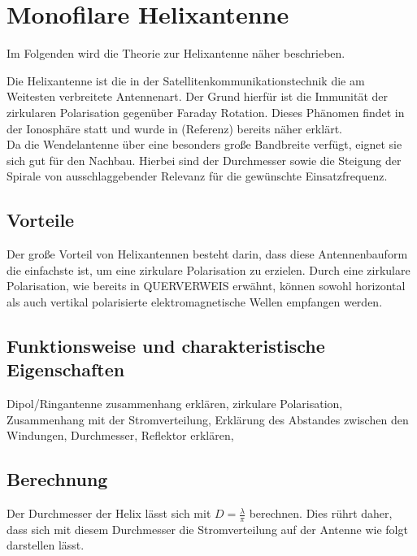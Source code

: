 \section{Monofilare Helixantenne}
Im Folgenden wird die Theorie zur Helixantenne näher beschrieben.

Die Helixantenne ist die in der Satellitenkommunikationstechnik die am Weitesten verbreitete Antennenart. Der Grund hierfür ist die Immunität der zirkularen Polarisation gegenüber Faraday Rotation. Dieses Phänomen findet in der Ionosphäre statt und wurde in (Referenz) bereits näher erklärt. \\
\newline
Da die Wendelantenne über eine besonders große Bandbreite verfügt, eignet sie sich gut für den Nachbau. Hierbei sind der Durchmesser sowie die Steigung der Spirale von ausschlaggebender Relevanz für die gewünschte Einsatzfrequenz. 

\subsection{Vorteile}
Der große Vorteil von Helixantennen besteht darin, dass diese Antennenbauform die einfachste ist, um eine zirkulare Polarisation zu erzielen. Durch eine zirkulare Polarisation, wie bereits in QUERVERWEIS erwähnt, können sowohl horizontal als auch vertikal polarisierte elektromagnetische Wellen empfangen werden.

\subsection{Funktionsweise und charakteristische Eigenschaften}
Dipol/Ringantenne zusammenhang erklären, zirkulare Polarisation, Zusammenhang mit der Stromverteilung, Erklärung des Abstandes zwischen den Windungen, Durchmesser, Reflektor erklären,

\subsection{Berechnung}
Der Durchmesser der Helix lässt sich mit $D=\frac{\lambda}{\pi}$ berechnen. Dies rührt daher, dass sich mit diesem Durchmesser die Stromverteilung auf der Antenne wie folgt darstellen lässt.